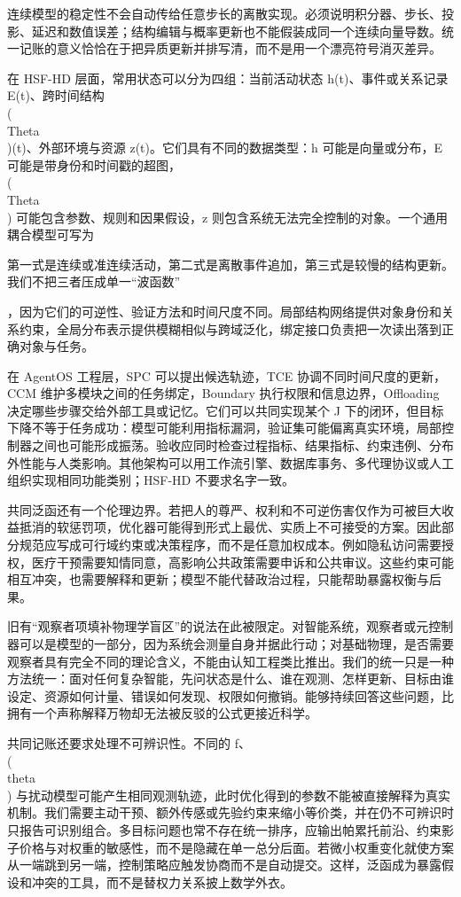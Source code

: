 连续模型的稳定性不会自动传给任意步长的离散实现。必须说明积分器、步长、投影、延迟和数值误差；结构编辑与概率更新也不能假装成同一个连续向量导数。统一记账的意义恰恰在于把异质更新并排写清，而不是用一个漂亮符号消灭差异。

在 HSF-HD 层面，常用状态可以分为四组：当前活动状态 h(t)、事件或关系记录 E(t)、跨时间结构 \\(\\Theta\\)(t)、外部环境与资源 z(t)。它们具有不同的数据类型：h 可能是向量或分布，E 可能是带身份和时间戳的超图，\\(\\Theta\\) 可能包含参数、规则和因果假设，z 则包含系统无法完全控制的对象。一个通用耦合模型可写为

第一式是连续或准连续活动，第二式是离散事件追加，第三式是较慢的结构更新。我们不把三者压成单一“波函数”

，因为它们的可逆性、验证方法和时间尺度不同。局部结构网络提供对象身份和关系约束，全局分布表示提供模糊相似与跨域泛化，绑定接口负责把一次读出落到正确对象与任务。

在 AgentOS 工程层，SPC 可以提出候选轨迹，TCE 协调不同时间尺度的更新，CCM 维护多模块之间的任务绑定，Boundary 执行权限和信息边界，Offloading 决定哪些步骤交给外部工具或记忆。它们可以共同实现某个 J 下的闭环，但目标下降不等于任务成功：模型可能利用指标漏洞，验证集可能偏离真实环境，局部控制器之间也可能形成振荡。验收应同时检查过程指标、结果指标、约束违例、分布外性能与人类影响。其他架构可以用工作流引擎、数据库事务、多代理协议或人工组织实现相同功能类别；HSF-HD 不要求名字一致。

共同泛函还有一个伦理边界。若把人的尊严、权利和不可逆伤害仅作为可被巨大收益抵消的软惩罚项，优化器可能得到形式上最优、实质上不可接受的方案。因此部分规范应写成可行域约束或决策程序，而不是任意加权成本。例如隐私访问需要授权，医疗干预需要知情同意，高影响公共政策需要申诉和公共审议。这些约束可能相互冲突，也需要解释和更新；模型不能代替政治过程，只能帮助暴露权衡与后果。

旧有“观察者项填补物理学盲区”的说法在此被限定。对智能系统，观察者或元控制器可以是模型的一部分，因为系统会测量自身并据此行动；对基础物理，是否需要观察者具有完全不同的理论含义，不能由认知工程类比推出。我们的统一只是一种方法统一：面对任何复杂智能，先问状态是什么、谁在观测、怎样更新、目标由谁设定、资源如何计量、错误如何发现、权限如何撤销。能够持续回答这些问题，比拥有一个声称解释万物却无法被反驳的公式更接近科学。

共同记账还要求处理不可辨识性。不同的 f、\\(\\theta\\) 与扰动模型可能产生相同观测轨迹，此时优化得到的参数不能被直接解释为真实机制。我们需要主动干预、额外传感或先验约束来缩小等价类，并在仍不可辨识时只报告可识别组合。多目标问题也常不存在统一排序，应输出帕累托前沿、约束影子价格与对权重的敏感性，而不是隐藏在单一总分后面。若微小权重变化就使方案从一端跳到另一端，控制策略应触发协商而不是自动提交。这样，泛函成为暴露假设和冲突的工具，而不是替权力关系披上数学外衣。

